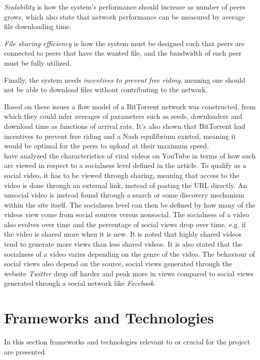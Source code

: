 \emph{Scalability} is how the system's performance should increase as number of peers grows, which also state that network performance can be measured by average file downloading time.

\emph{File sharing efficiency} is how the system must be designed such that peers are connected to peers that have the wanted file, and the bandwidth of each peer must be fully utilized.

Finally, the system needs \emph{incentives to prevent free riding}, meaning one should not be able to download files without contributing to the network.

Based on these issues a flow model of a BitTorrent network was constructed, from which they could infer averages of parameters such as seeds, downloaders and download time as functions of arrival rate. It's also shown that BitTorrent had incentives to prevent free riding and a Nash equilibrium existed, meaning it would be optimal for the peers to upload at their maximum speed.
\\


\citet{broxton2013catching} have analyzed the characteristics of viral videos on YouTube in terms of how such are viewed in respect to a socialness level defined in the article. To qualify as a social video, it has to be viewed through sharing, meaning that access to the video is done through an external link, instead of pasting the URL directly. An unsocial video is instead found through a search or some discovery mechanism within the site itself. The socialness level can then be defined by how many of the videos view come from social sources versus nonsocial. The socialness of a video also evolves over time and the percentage of social views drop over time, e.g. if the video is shared more when it is new. It is noted that highly shared videos tend to generate more views than less shared videos. It is also stated that the socialness of a video varies depending on the genre of the video. The behaviour of social views also depend on the source, social views generated through the website \textit{Twitter} drop off harder and peak more in views compared to social views generated through a social network like \textit{Facebook}.


\section{Frameworks and Technologies}
\label{sec:fram-techn}
In this section frameworks and technologies relevant to or crucial for the project are presented.

